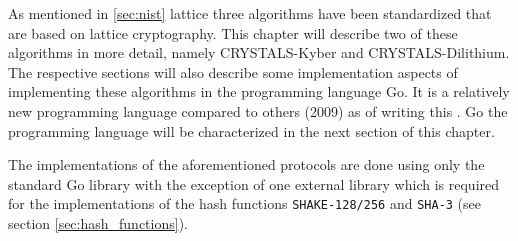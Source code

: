 As mentioned in \ref{sec:nist} lattice three algorithms have been standardized that are based on lattice cryptography. This chapter will describe two of these algorithms in more detail, namely CRYSTALS-Kyber and CRYSTALS-Dilithium. The respective sections will also describe some implementation aspects of implementing these algorithms in the programming language Go. It is a relatively new programming language compared to others (2009) as of writing this \cite{Donovan2016}. Go the programming language will be characterized in the next section of this chapter.

The implementations of the aforementioned protocols are done using only the standard Go library with the exception of one external library which is required for the implementations of the hash functions \texttt{SHAKE-128/256} and \texttt{SHA-3} (see section \ref{sec:hash_functions}).


